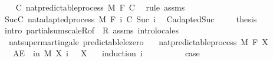 \begin{isabellebody}
\ \ \isamarkupfalse%
\ C{\isacharcolon}{\kern0pt}\ nat{\isacharunderscore}{\kern0pt}predictable{\isacharunderscore}{\kern0pt}process\ M\ F\ C\ \isamarkupfalse%
\ {\isacharparenleft}{\kern0pt}rule\ assms{\isacharparenright}{\kern0pt}\isanewline
\ \ \isamarkupfalse%
\ Suc{\isacharunderscore}{\kern0pt}C{\isacharcolon}{\kern0pt}\ nat{\isacharunderscore}{\kern0pt}adapted{\isacharunderscore}{\kern0pt}process\ M\ F\ {\isachardoublequoteopen}{\isasymlambda}i{\isachardot}{\kern0pt}\ C\ {\isacharparenleft}{\kern0pt}Suc\ i{\isacharparenright}{\kern0pt}{\isachardoublequoteclose}\ \isamarkupfalse%
\ C{\isachardot}{\kern0pt}adapted{\isacharunderscore}{\kern0pt}Suc\ \isacommand{{\isachardot}{\kern0pt}}\isamarkupfalse%
\isanewline
\ \ \isamarkupfalse%
\ {\isacharquery}{\kern0pt}thesis\ \isamarkupfalse%
\ {\isacharparenleft}{\kern0pt}intro\ partial{\isacharunderscore}{\kern0pt}sum{\isacharunderscore}{\kern0pt}scaleR{\isacharbrackleft}{\kern0pt}of\ {\isacharunderscore}{\kern0pt}\ R{\isacharbrackright}{\kern0pt}\ assms{\isacharparenright}{\kern0pt}\ {\isacharparenleft}{\kern0pt}intro{\isacharunderscore}{\kern0pt}locales{\isacharparenright}{\kern0pt}\isanewline
{}\isamarkupfalse%
%
\endisatagproof
{\isafoldproof}%
%
\isadelimproof
%
\endisadelimproof
%
\isadelimdocument
%
\endisadelimdocument
%
\isatagdocument
%
\isamarkuptrue%
%
\endisatagdocument
{\isafolddocument}%
%
\isadelimdocument
%
\endisadelimdocument
{}\isamarkupfalse%
\ {\isacharparenleft}{\kern0pt}\ nat{\isacharunderscore}{\kern0pt}supermartingale{\isacharparenright}{\kern0pt}\ predictable{\isacharunderscore}{\kern0pt}le{\isacharunderscore}{\kern0pt}zero{\isacharcolon}{\kern0pt}\isanewline
\ \ \ {\isachardoublequoteopen}nat{\isacharunderscore}{\kern0pt}predictable{\isacharunderscore}{\kern0pt}process\ M\ F\ X{\isachardoublequoteclose}\isanewline
\ \ \ {\isachardoublequoteopen}AE\ {\isasymxi}\ in\ M{\isachardot}{\kern0pt}\ X\ i\ {\isasymxi}\ {\isasymle}\ X\ {}\ {\isasymxi}{\isachardoublequoteclose}\isanewline
%
\isadelimproof
%
\endisadelimproof
%
\isatagproof
{}\isamarkupfalse%
\ {\isacharparenleft}{\kern0pt}induction\ i{\isacharparenright}{\kern0pt}\isanewline
\ \ \isamarkupfalse%
\ {}\isanewline
\ \ \isamarkupfalse%
\ \isamarkupfalse%
\ {\isacharquery}{\kern0pt}case\ \isamarkupfalse%

\end{isabellebody}
